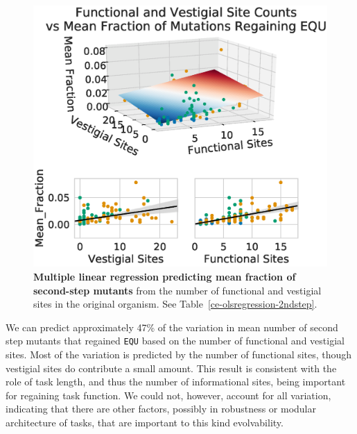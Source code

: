 \documentclass[10pt,letterpaper,final]{article}
\begin{document}
	\begin{figure}[!h] %
	\includegraphics[width=0.95\columnwidth]{figures/CE/fig14.eps}
	\caption{\textbf{Multiple linear regression predicting mean fraction of second-step mutants} from the number of functional and vestigial sites in the original organism. See Table~\ref{ce-olsregression-2ndstep}.
	}\label{fig:CCE_2step_vs_func_vest_sites}
	\end{figure}

We can predict approximately 47\% of the variation in mean number of second step mutants that regained \texttt{EQU} based on the number of functional and vestigial sites. Most of the variation is predicted by the number of functional sites, though vestigial sites do contribute a small amount. This result is consistent with the role of task length, and thus the number of informational sites, being important for regaining task function. We could not, however, account for all variation, indicating that there are other factors, possibly in robustness or modular architecture of tasks, that are important to this kind evolvability. %
\end{document}

